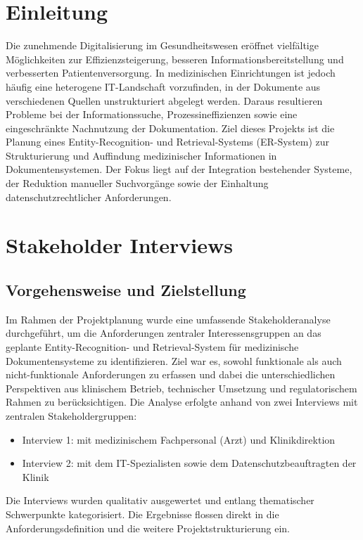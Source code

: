 \setcounter{chapter}{0} %

\chapter{Einleitung}
\label{sec:einleitung}
Die zunehmende Digitalisierung im Gesundheitswesen eröffnet vielfältige Möglichkeiten zur Effizienzsteigerung, besseren Informationsbereitstellung und verbesserten Patientenversorgung. In medizinischen Einrichtungen ist jedoch häufig eine heterogene IT-Landschaft vorzufinden, in der Dokumente aus verschiedenen Quellen unstrukturiert abgelegt werden. Daraus resultieren Probleme bei der Informationssuche, Prozessineffizienzen sowie eine eingeschränkte Nachnutzung der Dokumentation. 
Ziel dieses Projekts ist die Planung eines Entity-Recognition- und Retrieval-Systems (ER-System) zur Strukturierung und Auffindung medizinischer Informationen in Dokumentensystemen. Der Fokus liegt auf der Integration bestehender Systeme, der Reduktion manueller Suchvorgänge sowie der Einhaltung datenschutzrechtlicher Anforderungen.

{\let\clearpage\relax
\chapter{Stakeholder Interviews}}
\label{sec:stakeholder_interviews}
\section{Vorgehensweise und Zielstellung}
Im Rahmen der Projektplanung wurde eine umfassende Stakeholderanalyse durchgeführt, um die Anforderungen zentraler Interessensgruppen an das geplante Entity-Recognition- und Retrieval-System für medizinische Dokumentensysteme zu identifizieren. Ziel war es, sowohl funktionale als auch nicht-funktionale Anforderungen zu erfassen und dabei die unterschiedlichen Perspektiven aus klinischem Betrieb, technischer Umsetzung und regulatorischem Rahmen zu berücksichtigen.
Die Analyse erfolgte anhand von zwei Interviews mit zentralen Stakeholdergruppen:
\begin{itemize}
	\item Interview 1: mit medizinischem Fachpersonal (Arzt) und Klinikdirektion
	\item Interview 2: mit dem IT-Spezialisten sowie dem Datenschutzbeauftragten der Klinik
\end{itemize}
Die Interviews wurden qualitativ ausgewertet und entlang thematischer Schwerpunkte kategorisiert. Die Ergebnisse flossen direkt in die Anforderungsdefinition und die weitere Projektstrukturierung ein.
